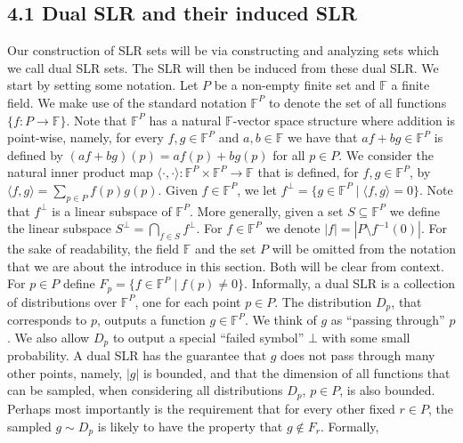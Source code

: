 \documentclass[10pt,a4paper]{article}
\begin{document}
\subsection*{4.1 Dual SLR and their induced SLR}
Our construction of SLR sets will be via constructing and analyzing sets which we call dual SLR sets. The SLR will then be induced from these dual SLR. We start by setting some notation. Let $P$ be a non-empty finite set and $\mathbb F$ a finite field. We make use of the standard notation $\mathbb F^P$ to denote the set of all functions $\{f:P\to\mathbb F\}$. Note that $\mathbb F^P$ has a natural $\mathbb F$-vector space structure where addition is point-wise, namely, for every $f,g\in\mathbb F^P$ and $a,b\in\mathbb F$ we have that $af+bg\in\mathbb F^P$ is defined by $(af+bg)(p)=af(p)+bg(p)$ for all $p\in P$. We consider the natural inner product map $\langle\cdot,\cdot\rangle:\mathbb F^P\times\mathbb F^P\to\mathbb F$ that is defined, for $f,g\in\mathbb F^P$, by $\langle f,g\rangle=\sum_{p\in P}f(p)g(p)$. Given $f\in\mathbb F^P$, we let $f^\perp=\{g\in\mathbb F^P\mid\langle f,g\rangle=0\}$. Note that $f^\perp$ is a linear subspace of $\mathbb F^P$. More generally, given a set $S\subseteq\mathbb F^P$ we define the linear subspace $S^\perp=\bigcap_{f\in S}f^\perp$. For $f\in\mathbb F^P$ we denote $|f|=|P\setminus f^{-1}(0)|$.
For the sake of readability, the field $\mathbb F$ and the set $P$ will be omitted from the notation that we are about the introduce in this section. Both will be clear from context. For $p\in P$ define $F_p=\{f\in\mathbb F^P\mid f(p)\ne0\}$. Informally, a dual SLR is a collection of distributions over $\mathbb F^P$, one for each point $p\in P$. The distribution $D_p$, that corresponds to $p$, outputs a function $g\in\mathbb F^P$. We think of $g$ as ``passing through'' $p$. We also allow $D_p$ to output a special ``failed symbol'' $\bot$ with some small probability. A dual SLR has the guarantee that $g$ does not pass through many other points, namely, $|g|$ is bounded, and that the dimension of all functions that can be sampled, when considering all distributions $D_p$, $p\in P$, is also bounded. Perhaps most importantly is the requirement that for every other fixed $r\in P$, the sampled $g\sim D_p$ is likely to have the property that $g\notin F_r$. Formally,
\end{document}
